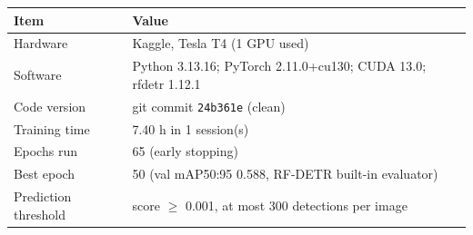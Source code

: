 \begin{tabular}{p{3.6cm}p{10.4cm}}
\toprule
Item & Value \\
\midrule
Hardware & Kaggle, Tesla T4 (1 GPU used) \\
Software & Python 3.13.16; PyTorch 2.11.0+cu130; CUDA 13.0; rfdetr 1.12.1 \\
Code version & git commit \texttt{24b361e} (clean) \\
Training time & 7.40 h in 1 session(s) \\
Epochs run & 65 (early stopping) \\
Best epoch & 50 (val mAP50:95 0.588, RF-DETR built-in evaluator) \\
Prediction threshold & score $\geq$ 0.001, at most 300 detections per image \\
\bottomrule
\end{tabular}
